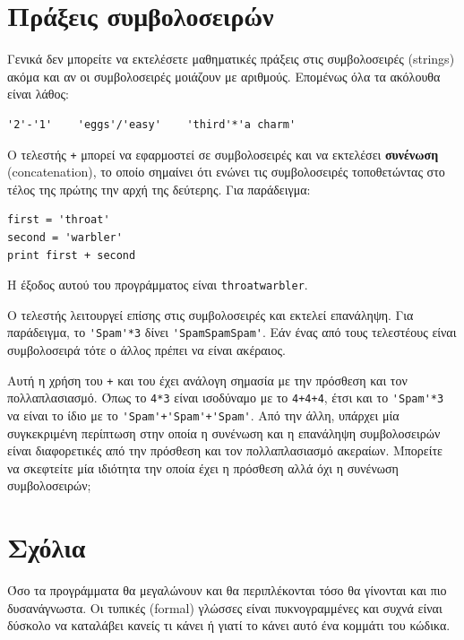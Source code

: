 \documentclass[10pt]{book}
\begin{document}
\section{Πράξεις συμβολοσειρών}

Γενικά δεν μπορείτε να εκτελέσετε μαθηματικές πράξεις στις συμβολοσειρές (strings) ακόμα και αν οι συμβολοσειρές μοιάζουν με αριθμούς. Επομένως όλα τα ακόλουθα είναι λάθος:

\begin{verbatim}
'2'-'1'    'eggs'/'easy'    'third'*'a charm'
\end{verbatim}
%

Ο τελεστής {\tt +} μπορεί να εφαρμοστεί σε συμβολοσειρές και να εκτελέσει 
{\bf συνένωση} (concatenation), το οποίο σημαίνει ότι ενώνει τις συμβολοσειρές
τοποθετώντας στο τέλος της πρώτης την αρχή της δεύτερης. Για παράδειγμα: 

\begin{verbatim}
first = 'throat'
second = 'warbler'
print first + second
\end{verbatim}
%

Η έξοδος αυτού του προγράμματος είναι {\tt throatwarbler}.

Ο τελεστής {\tt *} λειτουργεί επίσης στις συμβολοσειρές και εκτελεί
επανάληψη. Για παράδειγμα, το \verb"'Spam'*3" δίνει \verb"'SpamSpamSpam'". 
Εάν ένας από τους τελεστέους είναι συμβολοσειρά τότε ο άλλος πρέπει να είναι ακέραιος.

Αυτή η χρήση του {\tt +} και του {\tt *} έχει ανάλογη
σημασία με την πρόσθεση και τον πολλαπλασιασμό. Όπως το {\tt 4*3} 
είναι ισοδύναμο με το {\tt 4+4+4}, έτσι και το \verb"'Spam'*3"  να είναι το ίδιο με το  \verb"'Spam'+'Spam'+'Spam'". Από την άλλη, υπάρχει μία συγκεκριμένη περίπτωση στην οποία η συνένωση και η επανάληψη συμβολοσειρών είναι διαφορετικές από την πρόσθεση και τον πολλαπλασιασμό ακεραίων. Μπορείτε να σκεφτείτε μία ιδιότητα την οποία έχει η πρόσθεση αλλά όχι η συνένωση συμβολοσειρών;


\section{Σχόλια}

Όσο τα προγράμματα θα μεγαλώνουν και θα περιπλέκονται τόσο θα γίνονται 
και πιο δυσανάγνωστα. Οι τυπικές (formal) γλώσσες είναι πυκνογραμμένες 
και συχνά είναι δύσκολο να καταλάβει κανείς τι κάνει ή γιατί το κάνει αυτό ένα κομμάτι του κώδικα.
\end{document}

